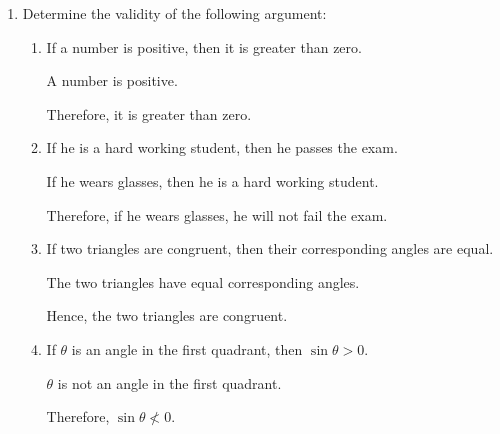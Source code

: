 \documentclass{report}
\begin{document}
\begin{enumerate}[leftmargin=*]
    \item Determine the validity of the following argument:
          \begin{enumerate}[label=(\alph*)]
              \item If a number is positive, then it is greater than zero.

                    A number is positive.

                    Therefore, it is greater than zero.

              \item If he is a hard working student, then he passes the exam.

                    If he wears glasses, then he is a hard working student.

                    Therefore, if he wears glasses, he will not fail the exam.

              \item If two triangles are congruent, then their corresponding angles are equal.

                    The two triangles have equal corresponding angles.

                    Hence, the two triangles are congruent.

              \item If $\theta$ is an angle in the first quadrant, then $\sin \theta > 0$.

                    $\theta$ is not an angle in the first quadrant.

                    Therefore, $\sin \theta \nless 0$.

          \end{enumerate}
\end{enumerate}
\end{document}
